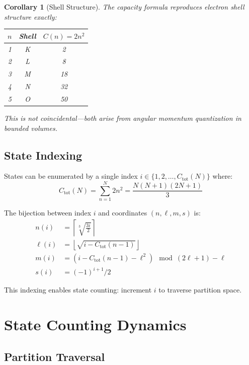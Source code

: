 \documentclass[twocolumn,10pt]{article}
\newtheorem{corollary}[theorem]{Corollary}
\begin{document}
\begin{corollary}[Shell Structure]
The capacity formula reproduces electron shell structure exactly:
\begin{center}
\begin{tabular}{ccc}
\toprule
$n$ & Shell & $C(n) = 2n^2$ \\
\midrule
1 & K & 2 \\
2 & L & 8 \\
3 & M & 18 \\
4 & N & 32 \\
5 & O & 50 \\
\bottomrule
\end{tabular}
\end{center}
This is not coincidental---both arise from angular momentum quantization in bounded volumes.
\end{corollary}

\subsection{State Indexing}

States can be enumerated by a single index $i \in \{1, 2, \ldots, C_{\text{tot}}(N)\}$ where:
\begin{equation}
    C_{\text{tot}}(N) = \sum_{n=1}^{N} 2n^2 = \frac{N(N+1)(2N+1)}{3}
\end{equation}

The bijection between index $i$ and coordinates $(n, \ell, m, s)$ is:
\begin{align}
    n(i) &= \left\lceil \sqrt[3]{\frac{3i}{2}} \right\rceil \\
    \ell(i) &= \left\lfloor \sqrt{i - C_{\text{tot}}(n-1)} \right\rfloor \\
    m(i) &= (i - C_{\text{tot}}(n-1) - \ell^2) \mod (2\ell + 1) - \ell \\
    s(i) &= (-1)^{i+1}/2
\end{align}

This indexing enables state counting: increment $i$ to traverse partition space.

\section{State Counting Dynamics}
\label{sec:counting}

\subsection{Partition Traversal}
\end{document}
